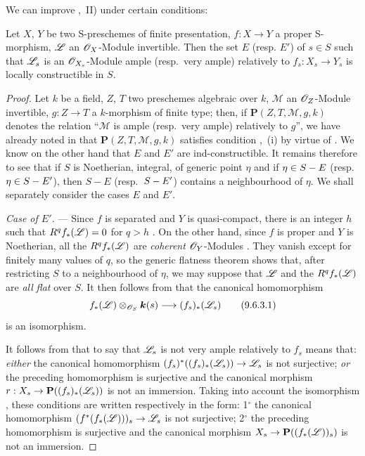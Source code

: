 We can improve ,~II) under certain conditions:

\begin{proposition}[9.6.3]
\label{IV.9.6.3}
Let $X$, $Y$ be two S-preschemes of finite presentation, $f:X\to Y$ a \textup{proper} S-morphism, $\mathscr{L}$ an $\mathscr{O}_X$-Module invertible.
Then the set $E$ \textup{(resp. $E'$)} of $s\in S$ such that $\mathscr{L}_s$ is an $\mathscr{O}_{X_s}$-Module ample \textup{(resp.}\ very ample\textup{)} relatively to $f_s:X_s\to Y_s$ is locally constructible in $S$.
\end{proposition}

\begin{proof}
Let $k$ be a field, $Z$, $T$ two preschemes algebraic over $k$, $\mathscr{M}$ an $\mathscr{O}_Z$-Module invertible, $g:Z\to T$ a $k$-morphism of finite type; then, if $\boldsymbol{P}(Z,T,\mathscr{M},g,k)$ denotes the relation ``$\mathscr{M}$ is ample (resp.\ very ample) relatively to $g$'', we have already noted in  that $\boldsymbol{P}(Z,T,\mathscr{M},g,k)$ satisfies condition ,~(i) by virtue of .
We know on the other hand that $E$ and $E'$ are ind-constructible.
It remains therefore to see that if $S$ is Noetherian, integral, of generic point $\eta$ and if $\eta\in S- E$ (resp.\ $\eta\in S- E'$), then $S-E$ (resp.\ $S- E'$) contains a neighbourhood of $\eta$.
We shall separately consider the cases $E$ and $E'$.


\emph{Case of $E'$.} ---
Since $f$ is separated and $Y$ is quasi-compact, there is an integer $h$ such that
$R^qf_*(\mathscr{L})=0$ for $q>h$ .
On the other hand, since $f$ is proper and $Y$ is Noetherian, all the
$R^qf_*(\mathscr{L})$ are \emph{coherent} $\mathscr{O}_Y$-Modules .
They vanish except for finitely many values of $q$, so the generic flatness theorem
 shows that, after restricting $S$ to a neighbourhood of $\eta$, we may
suppose that $\mathscr{L}$ and the $R^qf_*(\mathscr{L})$ are \emph{all} \emph{flat} over $S$.
It then follows from  that the canonical homomorphism
\begin{equation}
\label{IV.9.6.3.1}
 f_*(\mathscr{L})\otimes_{\mathscr{O}_S}\boldsymbol{k}(s)
 \longrightarrow (f_s)_*(\mathscr{L}_s)
 \tag{9.6.3.1}
\end{equation}
is an isomorphism.

It follows from  that to say that $\mathscr{L}_s$ is not very ample relatively to $f_s$ means that: \emph{either} the canonical homomorphism $(f_s)^*((f_s)_*(\mathscr{L}_s))\to\mathscr{L}_s$ is not surjective; \emph{or} the preceding homomorphism is surjective and the canonical morphism $r:X_s\to\mathbf{P}((f_s)_*(\mathscr{L}_s))$ is not an immersion.
Taking into account the isomorphism , these conditions are written respectively in the form: 1$^\circ$ the canonical homomorphism $(f^*(f_*(\mathscr{L})))_s\to\mathscr{L}_s$ is not surjective; 2$^\circ$ the preceding homomorphism is surjective and the canonical morphism $X_s\to\mathbf{P}((f_*(\mathscr{L}))_s)$ is not an immersion.


\end{proof}
